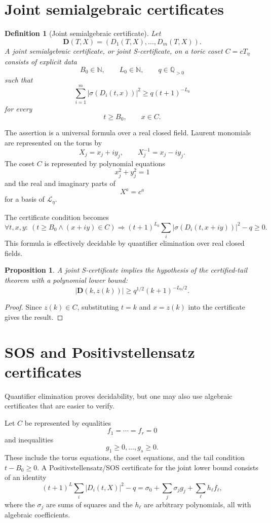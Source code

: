 \documentclass[11pt]{article}
\newtheorem{proposition}[theorem]{Proposition}
\newtheorem{definition}[theorem]{Definition}
\newcommand{\Q}{\mathbb Q}
\begin{document}
\section{Joint semialgebraic certificates}

\begin{definition}[Joint semialgebraic certificate]
Let
\[
\mathbf D(T,X)=(D_1(T,X),\ldots,D_m(T,X)).
\]
A joint semialgebraic certificate, or joint S-certificate, on a toric coset \(C=cT_\eta\) consists of explicit data
\[
B_0\in\mathbb N,\qquad L_0\in\mathbb N,\qquad q\in\Q_{>0}
\]
such that
\[
\sum_{i=1}^m|\sigma(D_i(t,x))|^2
\ge
q(t+1)^{-L_0}
\]
for every
\[
t\ge B_0,
\qquad
x\in C.
\]
\end{definition}

The assertion is a universal formula over a real closed field. Laurent monomials are represented on the torus by
\[
X_j=x_j+iy_j,
\qquad
X_j^{-1}=x_j-iy_j.
\]
The coset \(C\) is represented by polynomial equations
\[
x_j^2+y_j^2=1
\]
and the real and imaginary parts of
\[
X^a=c^a
\]
for a basis of \(\mathcal L_\eta\).

The certificate condition becomes
\[
\forall t,x,y:\ 
\left(t\ge B_0\wedge (x+iy)\in C\right)
\Rightarrow
(t+1)^{L_0}\sum_i|\sigma(D_i(t,x+iy))|^2-q\ge0.
\]
This formula is effectively decidable by quantifier elimination over real closed fields.

\begin{proposition}
A joint S-certificate implies the hypothesis of the certified-tail theorem with a polynomial lower bound:
\[
|\mathbf D(k,z(k))|\ge q^{1/2}(k+1)^{-L_0/2}.
\]
\end{proposition}

\begin{proof}
Since \(z(k)\in C\), substituting \(t=k\) and \(x=z(k)\) into the certificate gives the result.
\end{proof}

\section{SOS and Positivstellensatz certificates}

Quantifier elimination proves decidability, but one may also use algebraic certificates that are easier to verify.

Let \(C\) be represented by equalities
\[
f_1=\cdots=f_r=0
\]
and inequalities
\[
g_1\ge0,\ldots,g_s\ge0.
\]
These include the torus equations, the coset equations, and the tail condition \(t-B_0\ge0\). A Positivstellensatz/SOS certificate for the joint lower bound consists of an identity
\[
(t+1)^L\sum_i |D_i(t,X)|^2-q
=
\sigma_0+\sum_j\sigma_j g_j+\sum_\ell h_\ell f_\ell,
\]
where the \(\sigma_j\) are sums of squares and the \(h_\ell\) are arbitrary polynomials, all with algebraic coefficients.
\end{document}

